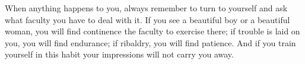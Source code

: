 When anything happens to you, always remember  to turn to yourself and ask what
faculty you  have to deal with  it. If you see  a beautiful boy or  a beautiful
woman, you  will find continence the  faculty to exercise there;  if trouble is
laid on you, you will find endurance;  if ribaldry, you will find patience. And
if you train yourself in this habit your impressions will not carry you away.

